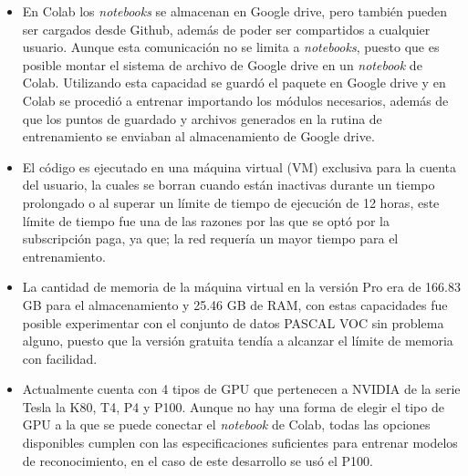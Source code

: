 \begin{itemize}
    \item En Colab los \textit{notebooks} se almacenan en Google drive, pero también pueden ser cargados desde Github, además de poder ser compartidos a cualquier usuario. Aunque esta comunicación no se limita a \textit{notebooks}, puesto que es posible montar el sistema de archivo de Google drive en un \textit{notebook} de Colab. Utilizando esta capacidad se guardó el paquete en Google drive y en Colab se procedió a entrenar importando los módulos necesarios, además de que los puntos de guardado y archivos generados en la rutina de entrenamiento se enviaban al almacenamiento de Google drive.
    \item El código es ejecutado en una máquina virtual (VM) exclusiva para la cuenta del usuario, la cuales se borran cuando están inactivas durante un tiempo prolongado o al superar un límite de tiempo de ejecución de 12 horas, este límite de tiempo fue una de las razones por las que se optó por la subscripción paga, ya que; la red requería un mayor tiempo para el entrenamiento.
    \item La cantidad de memoria de la máquina virtual en la versión Pro era de 166.83 GB para el almacenamiento y 25.46 GB de RAM, con estas capacidades fue posible experimentar con el conjunto de datos PASCAL VOC sin problema alguno, puesto que la versión gratuita tendía a alcanzar el límite de memoria con facilidad.
    \item Actualmente cuenta con 4 tipos de GPU que pertenecen a NVIDIA de la serie Tesla la K80, T4, P4 y P100. Aunque no hay una forma de elegir el tipo de GPU a la que se puede conectar el \textit{notebook} de Colab, todas las opciones disponibles cumplen con las especificaciones suficientes para entrenar modelos de reconocimiento, en el caso de este desarrollo se usó el P100.
\end{itemize}
